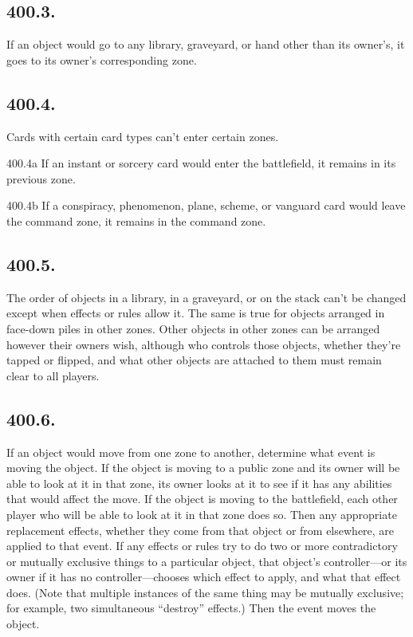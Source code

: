 \subsection*{400.3.}
If an object would go to any library, graveyard, or hand other than its owner’s, it goes to its owner’s corresponding zone.

\subsection*{400.4.}
Cards with certain card types can’t enter certain zones.

400.4a If an instant or sorcery card would enter the battlefield, it remains in its previous zone.

400.4b If a conspiracy, phenomenon, plane, scheme, or vanguard card would leave the command zone, it remains in the command zone.

\subsection*{400.5.}
The order of objects in a library, in a graveyard, or on the stack can’t be changed except when effects or rules allow it. The same is true for objects arranged in face-down piles in other zones. Other objects in other zones can be arranged however their owners wish, although who controls those objects, whether they’re tapped or flipped, and what other objects are attached to them must remain clear to all players.

\subsection*{400.6.}
If an object would move from one zone to another, determine what event is moving the object. If the object is moving to a public zone and its owner will be able to look at it in that zone, its owner looks at it to see if it has any abilities that would affect the move. If the object is moving to the battlefield, each other player who will be able to look at it in that zone does so. Then any appropriate replacement effects, whether they come from that object or from elsewhere, are applied to that event. If any effects or rules try to do two or more contradictory or mutually exclusive things to a particular object, that object’s controller—or its owner if it has no controller—chooses which effect to apply, and what that effect does. (Note that multiple instances of the same thing may be mutually exclusive; for example, two simultaneous “destroy” effects.) Then the event moves the object.

